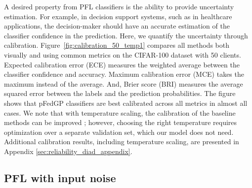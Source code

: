 \documentclass{article}
\def\Figref#1{Figure~\ref{#1}}
\begin{document}
A desired property from PFL classifiers is the ability to provide uncertainty estimation. For example, in decision support systems, such as in healthcare applications, the decision-maker should have an accurate estimation of the classifier confidence in the prediction.
Here, we quantify the uncertainty through calibration. \Figref{fig:calibration_50_temp1} compares all methods both visually and using common metrics \cite{brier1950verification,guo2017calibration, naeini2015obtaining} on the CIFAR-100 dataset with 50 clients. Expected calibration error (ECE) measures the weighted average between the classifier confidence and accuracy. Maximum calibration error (MCE) takes the maximum instead of the average. And, Brier score (BRI) \cite{brier1950verification} measures the average squared error between the labels and the prediction probabilities. The figure shows that pFedGP classifiers are best calibrated across all metrics in almost all cases. We note that with temperature scaling, the calibration of the baseline methods can be improved \cite{guo2017calibration}; however, choosing the right temperature requires optimization over a separate validation set, which our model does not need. Additional calibration results, including temperature scaling, are presented in Appendix \ref{sec:reliability_diad_appendix}.
















\subsection{PFL with input noise} \label{sec:pfl_in_noise}
\end{document}
